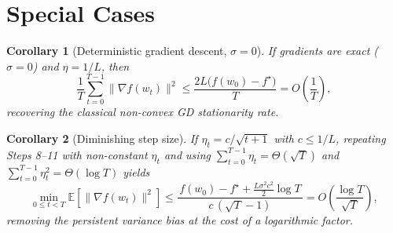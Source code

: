 \documentclass[11pt]{article}
\newtheorem{corollary}{Corollary}
\begin{document}
\section*{Special Cases}
\begin{corollary}[Deterministic gradient descent, $\sigma=0$]
If gradients are exact ($\sigma=0$) and $\eta=1/L$, then
\[
\frac{1}{T}\sum_{t=0}^{T-1}\|\nabla f(w_t)\|^2
\le\frac{2L\bigl(f(w_0)-f^\star\bigr)}{T}=O\!\left(\frac{1}{T}\right),
\]
recovering the classical non-convex GD stationarity rate.
\end{corollary}

\begin{corollary}[Diminishing step size]
If $\eta_t=c/\sqrt{t+1}$ with $c\le1/L$, repeating Steps 8--11 with
non-constant $\eta_t$ and using $\sum_{t=0}^{T-1}\eta_t=\Theta(\sqrt{T})$
and $\sum_{t=0}^{T-1}\eta_t^2=\Theta(\log T)$ yields
\[
\min_{0\le t<T}\mathbb{E}[\|\nabla f(w_t)\|^2]
\le \frac{\,f(w_0)-f^\star+\tfrac{L\sigma^2 c^2}{2}\log T\,}
{c\,(\sqrt{T}-1)}
=O\!\left(\frac{\log T}{\sqrt{T}}\right),
\]
removing the persistent variance bias at the cost of a logarithmic factor.
\end{corollary}
\end{document}
